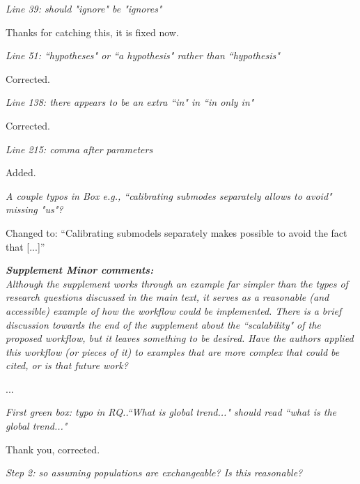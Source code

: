 \documentclass[11pt,letter]{article}
\begin{document}
\begin{mybox}
\emph{Line 39: should "ignore" be "ignores"}
\end{mybox}

Thanks for catching this, it is fixed now. 

\begin{mybox}
\emph{Line 51: ``hypotheses" or ``a hypothesis" rather than ``hypothesis"}
\end{mybox}

Corrected.

\begin{mybox}
\emph{Line 138: there appears to be an extra ``in" in ``in only in"}
\end{mybox}

Corrected.

\begin{mybox}
\emph{Line 215: comma after parameters}
\end{mybox}

Added.

\begin{mybox}
\emph{A couple typos in Box e.g., ``calibrating submodes separately allows to
avoid" missing "us"?}
\end{mybox}

Changed to: ``Calibrating submodels separately makes possible to avoid the fact that [...]''

\begin{mybox}
\emph{\textbf{Supplement Minor comments:}\\
Although the supplement works through an example far simpler than the
types of research questions discussed in the main text, it serves as a
reasonable (and accessible) example of how the workflow could be
implemented. There is a brief discussion towards the end of the
supplement about the ``scalability" of the proposed workflow, but it
leaves something to be desired. Have the authors applied this workflow
(or pieces of it) to examples that are more complex that could be cited,
or is that future work?}
\end{mybox}

... %

\begin{mybox}
\emph{First green box: typo in RQ..``What is global trend..." should read
``what is the global trend..."}
\end{mybox}

Thank you, corrected.

\begin{mybox}
\emph{Step 2: so assuming populations are exchangeable? Is this reasonable?}
\end{mybox}
\end{document}
